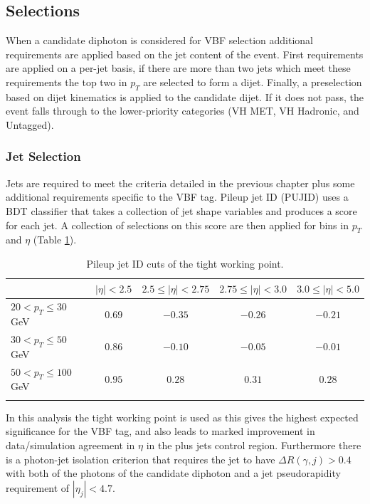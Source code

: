 \subsection{Selections}
When a candidate diphoton is considered for VBF selection additional requirements are applied based on the jet content of the event. First requirements are applied on a per-jet basis, if there are more than two jets which meet these requirements the top two in $p_{T}$ are selected to form a dijet. Finally, a preselection based on dijet kinematics is applied to the candidate dijet. If it does not pass, the event falls through to the lower-priority categories (VH MET, VH Hadronic, and Untagged). 

\subsubsection{Jet Selection}
Jets are required to meet the criteria detailed in the previous chapter plus some additional requirements specific to the VBF tag.
Pileup jet ID (PUJID) uses a BDT classifier \cite{CMS-PAS-JME-13-005} that takes a collection of jet shape variables and produces a score for each jet. A collection of selections on this score are then applied for bins in $p_{T}$ and $\eta$ (Table \ref{tab:event_selection:tight_pujid}). 
\begin{table}[h!]
    \centering
    \renewcommand{\arraystretch}{1.3}
    \begin{tabular}{ l | c c c c }
        \thickhline
         & $|\eta| < 2.5$ & $2.5 \leq |\eta| < 2.75$ & $2.75 \leq |\eta| < 3.0$ & $3.0 \leq |\eta| < 5.0$ \\
        \hline
        $20 < p_{T} \leq 30$\,GeV  & $0.69$ & $-0.35$ & $-0.26$ & $-0.21$ \\
        $30 < p_{T} \leq 50$\,GeV  & $0.86$ & $-0.10$  & $-0.05$ & $-0.01$ \\
        $50 < p_{T} \leq 100$\,GeV & $0.95$ & $0.28$  & $0.31$  & $0.28$  \\
        \thickhline
\end{tabular}
    \caption{Pileup jet ID cuts of the tight working point.}
    \label{tab:event_selection:tight_pujid}
\end{table}
In this analysis the tight working point is used as this gives the highest expected significance for the VBF tag, and also leads to marked improvement in data/simulation agreement in $\eta$ in the \Zee plus jets control region.  
Furthermore there is a photon-jet isolation criterion that requires the jet to have $\Delta{R}(\gamma,j) > 0.4$ with both of the photons of the candidate diphoton and a jet pseudorapidity requirement of  $|\eta_{j}| < 4.7$.







